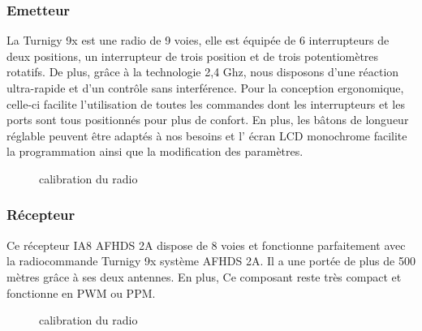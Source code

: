 	\subsubsection{Emetteur} 
	La Turnigy 9x est une radio de 9 voies, elle est équipée de 6 interrupteurs de deux positions, un interrupteur de trois position et de trois potentiomètres rotatifs.
	De plus, grâce à la technologie 2,4 Ghz, nous disposons d'une réaction ultra-rapide et d'un contrôle sans interférence. Pour la
	conception ergonomique, celle-ci facilite l'utilisation de toutes les commandes dont les interrupteurs et les ports sont tous positionnés pour plus de confort. En plus, les bâtons de longueur réglable peuvent être adaptés à nos besoins et l' écran LCD monochrome facilite la programmation ainsi que la modification des paramètres. 
	
	\begin{figure} [h]
		\begin{center}
			\centering
		\end{center}
		\caption{calibration du radio}
	\end{figure}
	\subsubsection{Récepteur }
	Ce récepteur IA8 AFHDS 2A dispose de 8 voies et fonctionne parfaitement avec la radiocommande Turnigy 9x système AFHDS 2A. Il a une portée de plus de 500 mètres  grâce à ses deux antennes. En plus, Ce composant reste très compact et fonctionne en PWM ou PPM.
	\begin{figure} [h]
		\begin{center}
			\centering
		\end{center}
		\caption{calibration du radio}
	\end{figure}
